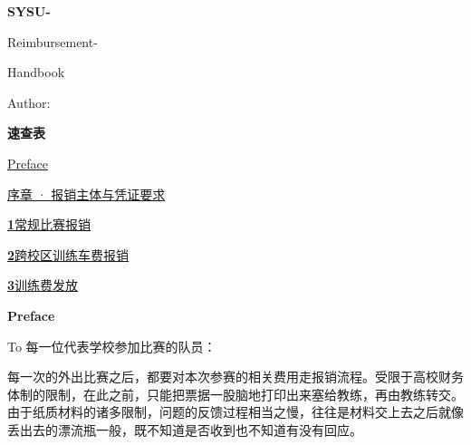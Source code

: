 \thispagestyle{empty}
\vspace*{30mm}
{\sffamily\bfseries\color{BookBlue}\fontsize{38.25}{45}\selectfont
SYSU-\par Reimbursement-\par Handbook\par}
\vspace{26pt}
{\sffamily\fontsize{14.25}{23}\selectfont Author: \par}
\clearpage
{}
\label{brief-contents}
\vspace*{5mm}
{\sffamily\bfseries\color{BookBlue}\fontsize{26.25}{34}\selectfont 速查表\par}
\vspace{30pt}
{\fontsize{12}{22}\selectfont
\hyperref[preface]{Preface\quad\textcolor{BookMuted}{\pageref*{preface}}}\par
\hyperref[prologue]{序章 · 报销主体与凭证要求\quad\textcolor{BookMuted}{\pageref*{prologue}}}\par}
\vspace{15pt}
{\sffamily\fontsize{13.5}{27}\selectfont
\hyperref[regular-competition]{\textcolor{BookBlue}{\bfseries 1}\quad 常规比赛报销\quad\textcolor{BookMuted}{\pageref*{regular-competition}}}\par
\hyperref[cross-campus-training]{\textcolor{BookBlue}{\bfseries 2}\quad 跨校区训练车费报销\quad\textcolor{BookMuted}{\pageref*{cross-campus-training}}}\par
\hyperref[training-allowance]{\textcolor{BookBlue}{\bfseries 3}\quad 训练费发放\quad\textcolor{BookMuted}{\pageref*{training-allowance}}}\par}
\clearpage
{}\label{preface}
\vspace*{5mm}
{\sffamily\bfseries\color{BookBlue}\fontsize{26.25}{34}\selectfont Preface\par}
\vspace{20pt}
\fontsize{12}{23.4}\selectfont
{\sffamily\fontsize{11.25}{21}\selectfont To 每一位代表学校参加比赛的队员：\par}
\vspace{6pt}
每一次的外出比赛之后，都要对本次参赛的相关费用走报销流程。受限于高校财务体制的限制，在此之前，只能把票据一股脑地打印出来塞给教练，再由教练转交。由于纸质材料的诸多限制，问题的反馈过程相当之慢，往往是材料交上去之后就像丢出去的漂流瓶一般，既不知道是否收到也不知道有没有回应。

